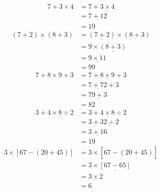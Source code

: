 \documentclass["../Cours.tex"]{subfiles}
\begin{document}
\begin{questions}
        \question 
        \begin{align*}
            7 + 3 \times 4 &= 7 + \underline{3 \times 4} \\
            &= \underline{7 + 12} \\
            &= 19
        \end{align*}
        \question
        \begin{align*}
            (7+2) \times (8+3) &= \underline{(7+2)} \times (8+3) \\
            &= 9 \times \underline{(8+3)} \\
            &= \underline{9 \times 11} \\
            &= 99
        \end{align*}
        \question
        \begin{align*}
            7 + 8 \times 9 + 3 &= 7 + \underline{8 \times 9} + 3 \\
            &= \underline{7 + 72} + 3 \\
            &= \underline{79 + 3} \\
            &= 82
        \end{align*}
        \question 
        \begin{align*}
            3 + 4 \times 8 \div 2 &= 3 + \underline{4 \times 8} \div 2 \\
            &= 3 + \underline{32 \div 2}\\
            &= \underline{3 + 16}\\
            &= 19
        \end{align*}
        \question
        \begin{align*}
            3 \times \left[ 67 - \left( 20 + 45 \right) \right] &= 3 \times \left[ 67 - \underline{\left( 20 + 45 \right)} \right] \\
            &= 3 \times \underline{\left[ 67 - 65 \right]} \\ 
            &= \underline{3 \times 2} \\
            &= 6
        \end{align*}
\end{questions}
\end{document}
